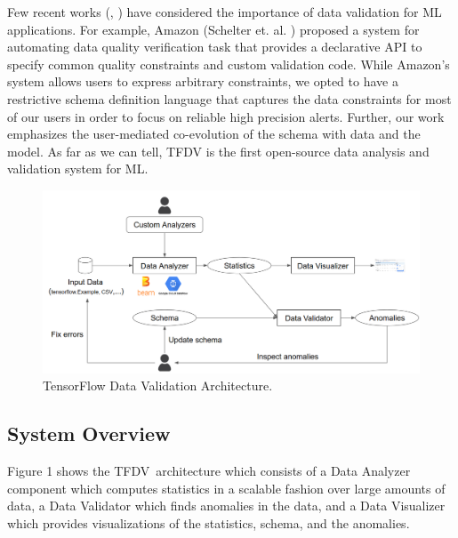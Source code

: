 \documentclass[11pt]{article}
\newcommand{\tfdv}{{\sf TFDV}}
\begin{document}
Few recent works (\cite{datavalidationamazon}, \cite{failingloudly}) have considered the importance of data validation for ML applications. For example,  Amazon (Schelter et. al. \cite{datavalidationamazon}) proposed a system for automating data quality verification task that provides a declarative API to specify common quality constraints and custom validation code. While Amazon’s system allows users to express arbitrary constraints, we opted to have a restrictive schema definition language that captures the data constraints for most of our users in order to focus on reliable high precision alerts. Further, our work emphasizes the user-mediated co-evolution of the schema with data and the model. As far as we can tell, TFDV is the first open-source data analysis and validation system for ML.

\begin{figure}[t]
  \includegraphics[width=\linewidth]{submissions/continuous-pipelines/figs/arch2.png}
  \caption{TensorFlow Data Validation Architecture.}
  \label{arch}
\vspace{-4mm}
\end{figure}

\subsection{System Overview}
Figure 1 shows the \tfdv\ architecture which consists of a Data Analyzer component which computes statistics in a scalable fashion over large amounts of data, a Data Validator which finds anomalies in the data, and a Data Visualizer which provides visualizations of the statistics, schema, and the anomalies.
\end{document}

